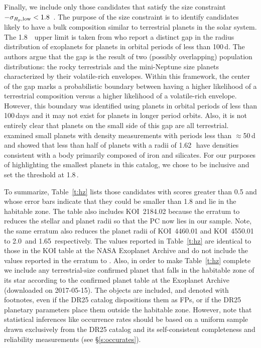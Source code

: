 Finally, we include only those candidates that satisfy the size constraint \rp~$- \sigma_{{R_p}\rm,low} < 1.8$~\re.  The purpose of the size constraint is to identify candidates likely to have a bulk composition similar to terrestrial planets in the solar system.  The 1.8~\re\ upper limit is taken from \citet{Fulton2017} who report a distinct gap in the radius distribution of exoplanets for planets in orbital periods of less than 100\,d.  The authors argue that the gap is the result of two (possibly overlapping) population distributions: the rocky terrestrials and the mini-Neptune size planets characterized by their volatile-rich envelopes.  Within this framework, the center of the gap marks a probabilistic boundary between having a higher likelihood of a terrestrial composition versus a higher likelihood of a volatile-rich envelope.  However, this boundary was identified using planets in orbital periods of less than 100\,days and it may not exist for planets in longer period orbits. Also, it is not entirely clear that planets on the small side of this gap are all terrestrial. \citet{Rogers2015} examined small planets with density measurements with periods less than $\approx$50\,d and showed that less than half of planets with a radii of 1.62\,\re\ have densities consistent with a body primarily composed of iron and silicates.  For our purposes of highlighting the smallest planets in this catalog, we chose to be inclusive and set the threshold at 1.8\,\re.


To summarize, Table~\ref{t:hz} lists those candidates with scores greater than 0.5 and whose error bars indicate that they could be smaller than 1.8 \re{} and lie in the habitable zone. The table also includes KOI~2184.02 because the erratum to \citet[][see \S\ref{s:stars} of this paper]{Mathur2017ApJS} reduces the stellar and planet radii so that the PC now lies in our sample. Note, the same erratum also reduces the planet radii of KOI~4460.01 and KOI~4550.01 to 2.0\,\re{} and 1.65\,\re{} respectively. The values reported in Table~\ref{t:hz} are identical to those in the KOI table at the NASA Exoplanet Archive and do not include the values reported in the erratum to \citet{Mathur2017ApJS}. Also, in order to make Table~\ref{t:hz} complete we include any \Kepler{} terrestrial-size confirmed planet that falls in the habitable zone of its star according to the confirmed planet table at the Exoplanet Archive (downloaded on 2017-05-15). The objects are included, and denoted with footnotes, even if the DR25 catalog dispositions them as FPs, or if the DR25 planetary parameters place them outside the habitable zone. However, note that statistical inferences like occurrence rates should be based on a uniform sample drawn exclusively from the DR25 catalog and its self-consistent completeness and reliability measurements (see \S\ref{s:occurates}).  


